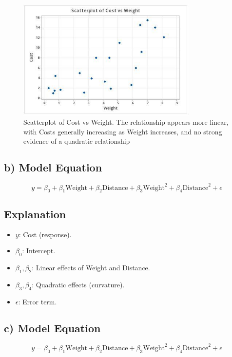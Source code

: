 \documentclass{article}
\begin{document}
\begin{figure}[h] %
    \centering %
    \includegraphics[width=0.8\textwidth]{COST_vs_WEIGHT.jpeg} %
    \caption{Scatterplot of Cost vs Weight. The relationship appears more linear, with Costs generally increasing as Weight increases, and no strong evidence of a quadratic relationship} %
    \label{fig:scatterplot-cost-distance} %
\end{figure}


\subsection*{b) Model Equation}

\[
y = \beta_0 + \beta_1 \text{Weight} + \beta_2 \text{Distance} + \beta_3 \text{Weight}^2 + \beta_4 \text{Distance}^2 + \epsilon
\]

\subsection*{Explanation}
\begin{itemize}
    \item \( y \): Cost (response).
    \item \( \beta_0 \): Intercept.
    \item \( \beta_1, \beta_2 \): Linear effects of Weight and Distance.
    \item \( \beta_3, \beta_4 \): Quadratic effects (curvature).
    \item \( \epsilon \): Error term.
\end{itemize}

\subsection*{c) Model Equation}
\[
y = \beta_0 + \beta_1 \text{Weight} + \beta_2 \text{Distance} + \beta_3 \text{Weight}^2 + \beta_4 \text{Distance}^2 + \epsilon
\]
\end{document}
